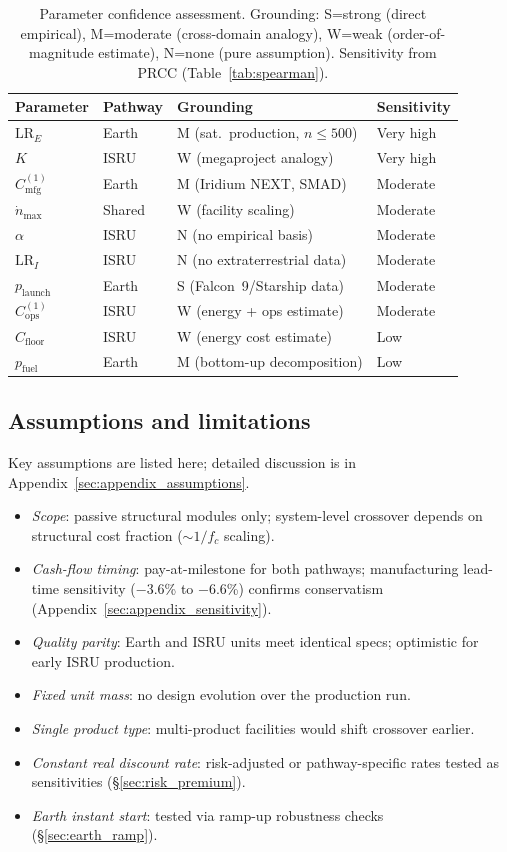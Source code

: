\documentclass[preprint,12pt]{elsarticle}
\begin{document}
\begin{table}[htbp]
\centering
\caption{Parameter confidence assessment. Grounding: S=strong (direct empirical), M=moderate (cross-domain analogy), W=weak (order-of-magnitude estimate), N=none (pure assumption). Sensitivity from PRCC (Table~\ref{tab:spearman}).}
\label{tab:confidence}
\small
\begin{tabular}{@{}llll@{}}
\toprule
Parameter & Pathway & Grounding & Sensitivity \\
\midrule
$\mathrm{LR}_E$ & Earth & M (sat.\ production, $n\leq500$) & Very high \\
$K$ & ISRU & W (megaproject analogy) & Very high \\
$C_{\mathrm{mfg}}^{(1)}$ & Earth & M (Iridium NEXT, SMAD) & Moderate \\
$\dot{n}_{\max}$ & Shared & W (facility scaling) & Moderate \\
$\alpha$ & ISRU & N (no empirical basis) & Moderate \\
$\mathrm{LR}_I$ & ISRU & N (no extraterrestrial data) & Moderate \\
$p_{\mathrm{launch}}$ & Earth & S (Falcon~9/Starship data) & Moderate \\
$C_{\mathrm{ops}}^{(1)}$ & ISRU & W (energy + ops estimate) & Moderate \\
$C_{\mathrm{floor}}$ & ISRU & W (energy cost estimate) & Low \\
$p_{\mathrm{fuel}}$ & Earth & M (bottom-up decomposition) & Low \\
\bottomrule
\end{tabular}
\end{table}

\subsection{Assumptions and limitations}

Key assumptions are listed here; detailed discussion is in Appendix~\ref{sec:appendix_assumptions}.
\begin{itemize}
  \item \emph{Scope}: passive structural modules only; system-level crossover depends on structural cost fraction ($\sim$$1/f_c$ scaling).
  \item \emph{Cash-flow timing}: pay-at-milestone for both pathways; manufacturing lead-time sensitivity ($-$3.6\% to $-$6.6\%) confirms conservatism (Appendix~\ref{sec:appendix_sensitivity}).
  \item \emph{Quality parity}: Earth and ISRU units meet identical specs; optimistic for early ISRU production.
  \item \emph{Fixed unit mass}: no design evolution over the production run.
  \item \emph{Single product type}: multi-product facilities would shift crossover earlier.
  \item \emph{Constant real discount rate}: risk-adjusted or pathway-specific rates tested as sensitivities (\S\ref{sec:risk_premium}).
  \item \emph{Earth instant start}: tested via ramp-up robustness checks (\S\ref{sec:earth_ramp}).
\end{itemize}
\end{document}
